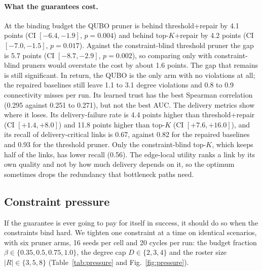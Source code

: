 \documentclass[11pt]{article}
\begin{document}
\paragraph{What the guarantees cost.}
At the binding budget the QUBO pruner is behind threshold+repair by 4.1
points (CI $[-6.4,-1.9]$, $p=0.004$) and behind top-$K$+repair by 4.2 points
(CI $[-7.0,-1.5]$, $p=0.017$). Against the constraint-blind threshold pruner
the gap is 5.7 points (CI $[-8.7,-2.9]$, $p=0.002$), so comparing only with
constraint-blind pruners would overstate the cost by about 1.6 points. The
gap that remains is still significant. In return, the QUBO is the only arm
with no violations at all; the repaired baselines still leave 1.1 to 3.1
degree violations and 0.8 to 0.9 connectivity misses per run. Its learned
trust has the best Spearman correlation (0.295 against 0.251 to 0.271), but
not the best AUC. The delivery metrics show where it loses. Its
delivery-failure rate is 4.4 points higher than threshold+repair (CI
$[+1.4,+8.0]$) and 11.8 points higher than top-$K$ (CI $[+7.6,+16.0]$), and
its recall of delivery-critical links is 0.67, against 0.82 for the repaired
baselines and 0.93 for the threshold pruner. Only the constraint-blind
top-$K$, which keeps half of the links, has lower recall (0.56). The
edge-local utility ranks a link by its own quality and not by how much
delivery depends on it, so the optimum sometimes drops the redundancy that
bottleneck paths need.

\subsection{Constraint pressure}
\label{sec:pressure}

If the guarantee is ever going to pay for itself in success, it should do so
when the constraints bind hard. We tighten one constraint at a time on
identical scenarios, with six pruner arms, 16 seeds per cell and 20 cycles
per run: the budget fraction $\beta\in\{0.35,0.5,0.75,1.0\}$, the degree cap
$D\in\{2,3,4\}$ and the roster size $|R|\in\{3,5,8\}$ (Table~\ref{tab:pressure}
and Fig.~\ref{fig:pressure}).
\end{document}
